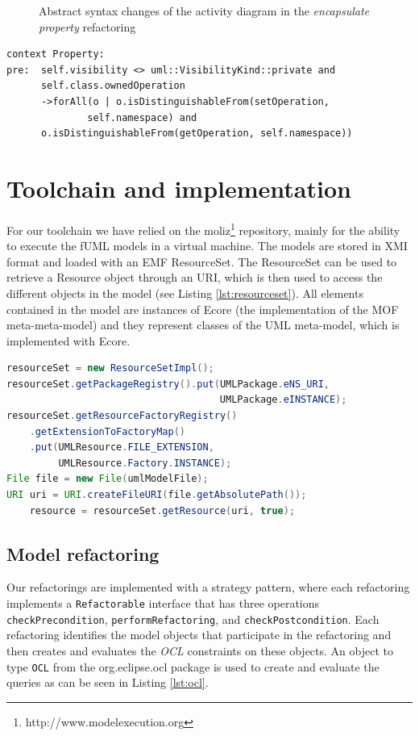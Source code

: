 \documentclass{llncs}
\begin{document}
\begin{figure}
{\begin{tabular}{c | c}
 \end{tabular}
 }
 \label{fig:encapsulateproperty}
 \caption{Abstract syntax changes of the activity diagram in the \textit{encapsulate property} refactoring}
\end{figure}


\begin{lstlisting}[language=OCL,caption=OCL for encapsulate property,label=lst:encapsulateproperty]
context Property:
pre:  self.visibility <> uml::VisibilityKind::private and
      self.class.ownedOperation
      ->forAll(o | o.isDistinguishableFrom(setOperation,
              self.namespace) and
      o.isDistinguishableFrom(getOperation, self.namespace))
\end{lstlisting}


\section{Toolchain and implementation}
\label{sec:toolchain}
For our toolchain we have relied on the moliz\footnote{http://www.modelexecution.org} repository, mainly for the ability to execute the fUML 
models in a virtual machine. The models are stored in XMI format and loaded with an EMF ResourceSet. The ResourceSet
can be used to retrieve a Resource object through an URI, which is then used to access the different objects in the model 
(see Listing \ref{lst:resourceset}). All elements contained in the model are instances of Ecore (the implementation of
the MOF meta-meta-model) and they represent classes of the UML meta-model, which is implemented with Ecore.

\begin{lstlisting}[language=Java,caption=Getting the resourceset,label=lst:resourceset]
resourceSet = new ResourceSetImpl();
resourceSet.getPackageRegistry().put(UMLPackage.eNS_URI,
                                     UMLPackage.eINSTANCE);
resourceSet.getResourceFactoryRegistry()
    .getExtensionToFactoryMap()
    .put(UMLResource.FILE_EXTENSION,
         UMLResource.Factory.INSTANCE);
File file = new File(umlModelFile);
URI uri = URI.createFileURI(file.getAbsolutePath());
    resource = resourceSet.getResource(uri, true);
\end{lstlisting}

\subsection{Model refactoring}
Our refactorings are implemented with a strategy pattern, where each refactoring implements a \texttt{Refactorable}
interface that has three operations \texttt{checkPrecondition}, \texttt{performRefactoring}, and \texttt{checkPostcondition}. 
Each refactoring identifies the model objects that participate in the refactoring and then creates and evaluates the \textit{OCL} 
constraints on these objects. An object to type \texttt{OCL} from the org.eclipse.ocl package is used to create and evaluate the 
queries as can be seen in Listing \ref{lst:ocl}.
\end{document}

